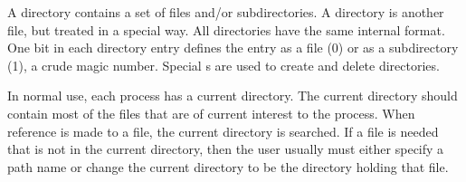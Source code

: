 A directory contains a set of files and/or subdirectories.
A directory is another file, but treated in a special way.
All directories have the same internal format.
One bit in each directory entry defines the entry as a file (0) or as a subdirectory (1), a crude magic number.
Special s are used to create and delete directories.

In normal use, each process has a current directory.
The current directory should contain most of the files that are of current interest to the process.
When reference is made to a file, the current directory is searched.
If a file is needed that is not in the current directory, then the user usually must either specify a path name or change the current directory to be the directory holding that file.


